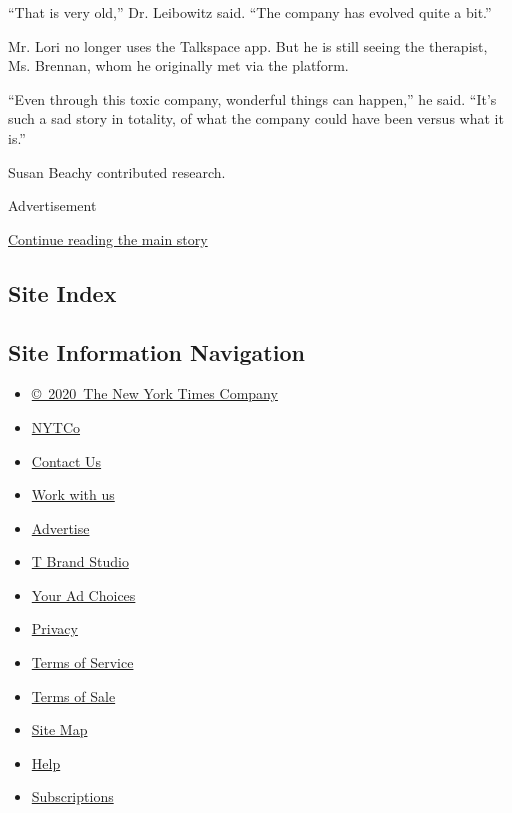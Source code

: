 ``That is very old,'' Dr. Leibowitz said. ``The company has evolved
quite a bit.''

Mr. Lori no longer uses the Talkspace app. But he is still seeing the
therapist, Ms. Brennan, whom he originally met via the platform.

``Even through this toxic company, wonderful things can happen,'' he
said. ``It's such a sad story in totality, of what the company could
have been versus what it is.''

Susan Beachy contributed research.

Advertisement

\protect\hyperlink{after-bottom}{Continue reading the main story}

\hypertarget{site-index}{%
\subsection{Site Index}\label{site-index}}

\hypertarget{site-information-navigation}{%
\subsection{Site Information
Navigation}\label{site-information-navigation}}

\begin{itemize}
\tightlist
\item
  \href{https://help.nytimes.com/hc/en-us/articles/115014792127-Copyright-notice}{©~2020~The
  New York Times Company}
\end{itemize}

\begin{itemize}
\tightlist
\item
  \href{https://www.nytco.com/}{NYTCo}
\item
  \href{https://help.nytimes.com/hc/en-us/articles/115015385887-Contact-Us}{Contact
  Us}
\item
  \href{https://www.nytco.com/careers/}{Work with us}
\item
  \href{https://nytmediakit.com/}{Advertise}
\item
  \href{http://www.tbrandstudio.com/}{T Brand Studio}
\item
  \href{https://www.nytimes.com/privacy/cookie-policy\#how-do-i-manage-trackers}{Your
  Ad Choices}
\item
  \href{https://www.nytimes.com/privacy}{Privacy}
\item
  \href{https://help.nytimes.com/hc/en-us/articles/115014893428-Terms-of-service}{Terms
  of Service}
\item
  \href{https://help.nytimes.com/hc/en-us/articles/115014893968-Terms-of-sale}{Terms
  of Sale}
\item
  \href{https://spiderbites.nytimes.com}{Site Map}
\item
  \href{https://help.nytimes.com/hc/en-us}{Help}
\item
  \href{https://www.nytimes.com/subscription?campaignId=37WXW}{Subscriptions}
\end{itemize}

